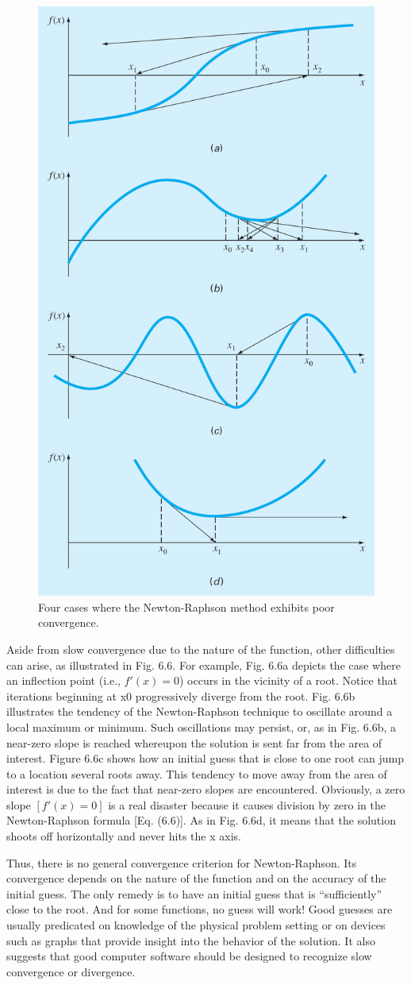 \documentclass[../main.tex]{subfiles}
\begin{document}
\begin{figure}[h]
    \includegraphics[width=0.5\linewidth]{./images/fig_6_6}
    \caption{Four cases where the Newton-Raphson method exhibits poor convergence.}
\end{figure}

Aside from slow convergence due to the nature of the function, other difficulties can
arise, as illustrated in Fig. 6.6. For example, Fig. 6.6a depicts the case where an inflection
point (i.e., $f'(x) = 0$) occurs in the vicinity of a root. Notice that iterations beginning at x0
progressively diverge from the root. Fig. 6.6b illustrates the tendency of the Newton-Raphson
technique to oscillate around a local maximum or minimum. Such oscillations may persist, or,
as in Fig. 6.6b, a near-zero slope is reached whereupon the solution is sent far from the area of
interest. Figure 6.6c shows how an initial guess that is close to one root can jump to a location
several roots away. This tendency to move away from the area of interest is due to the fact that
near-zero slopes are encountered. Obviously, a zero slope $[f'(x) = 0]$ is a real disaster because
it causes division by zero in the Newton-Raphson formula [Eq. (6.6)]. As in Fig. 6.6d,
it means that the solution shoots off horizontally and never hits the x axis.

Thus, there is no general convergence criterion for Newton-Raphson. Its convergence
depends on the nature of the function and on the accuracy of the initial guess. The only
remedy is to have an initial guess that is ``sufficiently'' close to the root. And for some functions,
no guess will work! Good guesses are usually predicated on knowledge of the physical
problem setting or on devices such as graphs that provide insight into the behavior of
the solution. It also suggests that good computer software should be designed to recognize
slow convergence or divergence.\\
\bigskip
\end{document}

